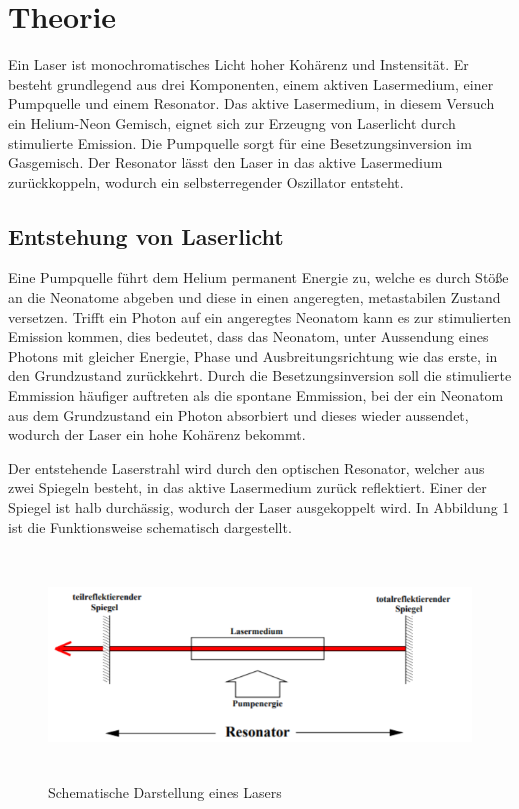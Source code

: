 \section{Theorie}
\label{sec:Theorie}

\cite{sample}

Ein Laser ist monochromatisches Licht hoher Kohärenz und Instensität. Er besteht grundlegend aus drei
Komponenten, einem aktiven Lasermedium, einer Pumpquelle und einem Resonator.
Das aktive Lasermedium, in diesem Versuch ein Helium-Neon Gemisch, eignet sich zur Erzeugng
von Laserlicht durch stimulierte Emission. Die Pumpquelle sorgt für eine Besetzungsinversion im Gasgemisch.
Der Resonator lässt den Laser in das aktive Lasermedium zurückkoppeln, wodurch ein
selbsterregender Oszillator entsteht.

\subsection{Entstehung von Laserlicht}
Eine Pumpquelle führt dem Helium permanent Energie zu, welche es durch Stöße an
die Neonatome abgeben und diese in einen angeregten, metastabilen Zustand versetzen.
Trifft ein Photon auf ein angeregtes Neonatom kann es zur stimulierten Emission kommen, dies
bedeutet, dass das Neonatom, unter Aussendung eines Photons mit gleicher Energie, Phase und
Ausbreitungsrichtung wie das erste, in den Grundzustand zurückkehrt. Durch die Besetzungsinversion soll
die stimulierte Emmission häufiger auftreten als die spontane Emmission, bei der ein Neonatom aus
dem Grundzustand ein Photon absorbiert und dieses wieder aussendet, wodurch der Laser ein hohe
Kohärenz bekommt.

Der entstehende Laserstrahl wird durch den optischen Resonator, welcher aus zwei Spiegeln besteht,
in das aktive Lasermedium zurück reflektiert. Einer der Spiegel ist halb durchässig, wodurch der
Laser ausgekoppelt wird. In Abbildung 1 ist die Funktionsweise schematisch dargestellt.

\begin{figure}[H]
  \centering
  \includegraphics[height=6cm]{Lasermedium.PNG}
  \caption{Schematische Darstellung eines Lasers \cite{sample}}
  \label{fig:Lock}
\end{figure}


